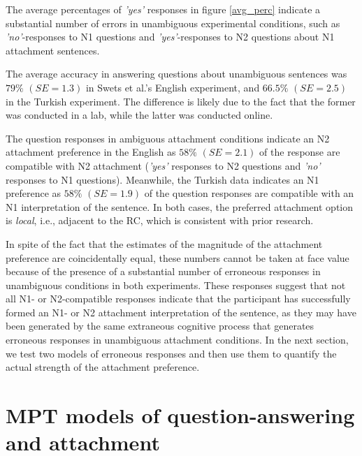 \documentclass[11pt]{article}\usepackage[]{graphicx}\usepackage[]{color}
\begin{document}
The average percentages of \textit{'yes'} responses in figure \ref{avg_perc} indicate a substantial number of errors in unambiguous experimental conditions, such as \textit{'no'}-responses to N1 questions and \textit{'yes'}-responses to N2 questions about N1 attachment sentences.

The average accuracy in answering questions about unambiguous sentences was $79\%$ $(SE=1.3)$
in Swets et al.'s English experiment, and $66.5\%$ $(SE=2.5)$
in the Turkish experiment. The difference is likely due to the fact that the former was conducted in a lab, while the latter was conducted online.

The question responses in ambiguous attachment conditions indicate an N2 attachment preference in the English as $58\%$ $(SE=2.1)$ of the response are compatible with N2 attachment (\textit{'yes'} responses to N2 questions and \textit{'no'} responses to N1 questions). Meanwhile, the Turkish data indicates an N1 preference as $58\%$ $(SE=1.9)$ of the question responses are compatible with an N1 interpretation of the sentence. In both cases, the preferred attachment option is \textit{local}, i.e., adjacent to the RC, which is consistent with prior research.

In spite of the fact that the estimates of the magnitude of the attachment preference are coincidentally equal, these numbers cannot be taken at face value because of the presence of a substantial number of erroneous responses in unambiguous conditions in both experiments. These responses suggest that not all N1- or N2-compatible responses indicate that the participant has successfully formed an N1- or N2 attachment interpretation of the sentence, as they may have been generated by the same extraneous cognitive process that generates erroneous responses in unambiguous attachment conditions. 
In the next section, we test two models of erroneous responses and then use them to quantify the actual strength of the attachment preference.



\section{MPT models of question-answering and attachment}
\end{document}
